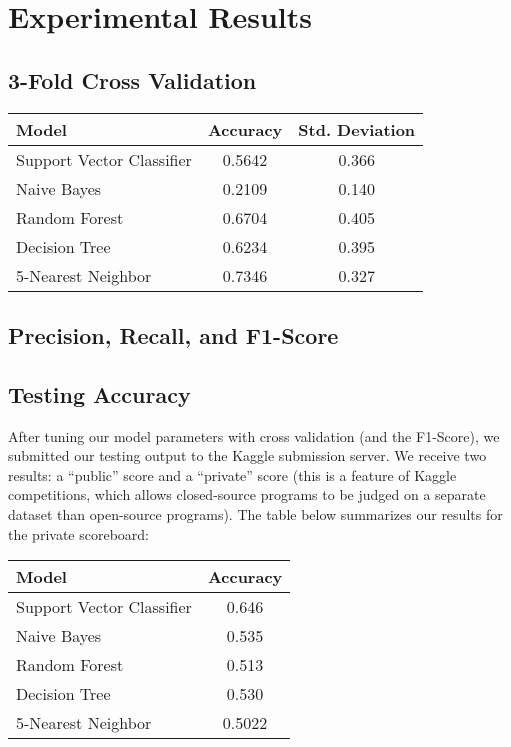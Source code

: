 \documentclass{article} %
\begin{document}
\section{Experimental Results}
\subsection{3-Fold Cross Validation}
\begin{center}\begin{tabular}{|l|cc|}\hline
	\textbf{Model} & \textbf{Accuracy} & \textbf{Std. Deviation} \\\hline
	Support Vector Classifier & 0.5642 & 0.366 \\
	Naive Bayes & 0.2109 & 0.140 \\
	Random Forest & 0.6704 & 0.405 \\
	Decision Tree & 0.6234 & 0.395 \\
	5-Nearest Neighbor & 0.7346 & 0.327 \\\hline
\end{tabular}\end{center}

\subsection{Precision, Recall, and F1-Score}

\subsection{Testing Accuracy}
After tuning our model parameters with cross validation (and the F1-Score), we submitted our testing output to the Kaggle submission server.  We receive two results: a ``public'' score and a ``private'' score (this is a feature of Kaggle competitions, which allows closed-source programs to be judged on a separate dataset than open-source programs).  The table below summarizes our results for the private scoreboard:

\begin{center}\begin{tabular}{|l|c|}\hline
\textbf{Model} & \textbf{Accuracy} \\\hline
Support Vector Classifier & 0.646 \\
Naive Bayes & 0.535 \\
Random Forest & 0.513 \\
Decision Tree & 0.530 \\
5-Nearest Neighbor & 0.5022 \\\hline
\end{tabular}\end{center}
\end{document}
